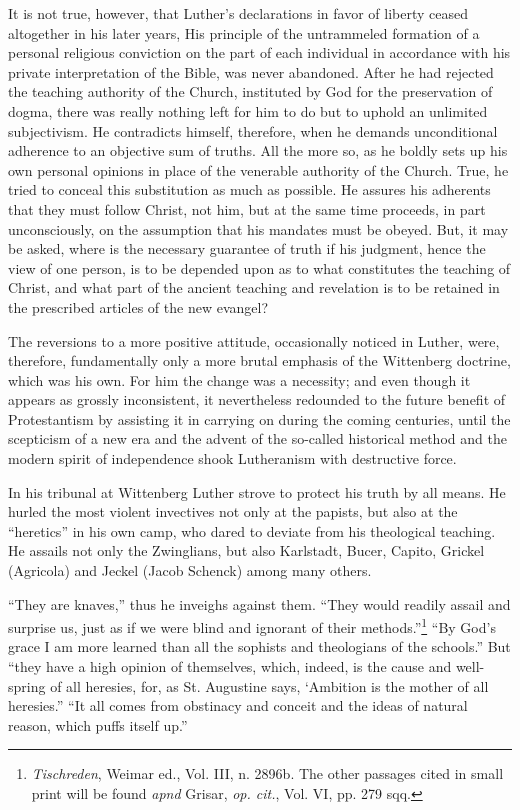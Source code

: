 It is not true, however, that Luther’s declarations in favor of liberty
ceased altogether in his later years, His principle of the untrammeled
formation of a personal religious conviction on the part of
each individual in accordance with his private interpretation of the
Bible, was never abandoned. After he had rejected the teaching
authority of the Church, instituted by God for the preservation of
dogma, there was really nothing left for him to do but to uphold
an unlimited subjectivism. He contradicts himself, therefore, when he
demands unconditional adherence to an objective sum of truths. All
the more so, as he boldly sets up his own personal opinions in place of
the venerable authority of the Church. True, he tried to conceal this
substitution as much as possible. He assures his adherents that they
must follow Christ, not him, but at the same time proceeds, in part
unconsciously, on the assumption that his mandates must be obeyed.
But, it may be asked, where is the necessary guarantee of truth if his
judgment, hence the view of one person, is to be depended upon as to
what constitutes the teaching of Christ, and what part of the ancient
teaching and revelation is to be retained in the prescribed articles of
the new evangel?

The reversions to a more positive attitude, occasionally noticed
in Luther, were, therefore, fundamentally only a more brutal emphasis
of the Wittenberg doctrine, which was his own. For him the change
was a necessity; and even though it appears as grossly inconsistent, it
nevertheless redounded to the future benefit of Protestantism by
assisting it in carrying on during the coming centuries, until the
scepticism of a new era and the advent of the so-called historical
method and the modern spirit of independence shook Lutheranism
with destructive force.

In his tribunal at Wittenberg Luther strove to protect his truth
by all means. He hurled the most violent invectives not only at the
papists, but also at the “heretics” in his own camp, who dared to
deviate from his theological teaching. He assails not only the Zwinglians,
but also Karlstadt, Bucer, Capito, Grickel (Agricola) and Jeckel
(Jacob Schenck) among many others.

“They are knaves,” thus he inveighs against them. “They would readily
assail and surprise us, just as if we were blind and ignorant of their
methods.”\footnote
{\textit{Tischreden}, Weimar ed., Vol. III, n. 2896b. The other passages cited in small print
will be found \textit{apnd} Grisar, \textit{op. cit.}, Vol. VI, pp. 279 sqq.}
“By God’s grace I am more learned than all the sophists and
theologians of the schools.” But “they have a high opinion of themselves,
which, indeed, is the cause and well-spring of all heresies, for, as St. Augustine
says, ‘Ambition is the mother of all heresies.” “It all comes from obstinacy
and conceit and the ideas of natural reason, which puffs itself up.”

